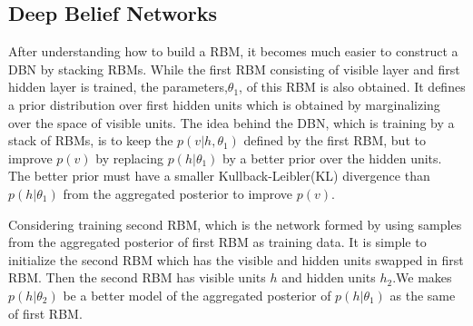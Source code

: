 \documentclass{llncs}
\begin{document}
\subsection{Deep Belief Networks}
After understanding how to build a RBM, it becomes much easier to construct a DBN by stacking RBMs. While the first RBM consisting of visible layer and first hidden layer is trained, the parameters,$\theta_1$, of this RBM is also obtained. It defines a prior distribution over first hidden units which is obtained by marginalizing over the space of visible units. The idea behind the DBN, which is training by a stack of RBMs, is to keep the $p(v|h,\theta_1)$ defined by the first RBM, but to improve $p(v)$ by replacing $p(h|\theta_1)$ by a better prior over the hidden units. The better prior must have a smaller Kullback-Leibler(KL) divergence than $p(h|\theta_1)$ from the aggregated posterior to improve $p(v)$. 


Considering training second RBM, which is the network formed by using samples from the aggregated posterior of first RBM as training data. It is simple to initialize the second RBM which has the visible and hidden units swapped in first RBM. Then the second RBM has visible units $h$ and hidden units $h_2$.We makes $p(h|\theta_2)$ be a better model of the aggregated posterior of $p(h|\theta_1)$ as the same of first RBM.
\end{document}
